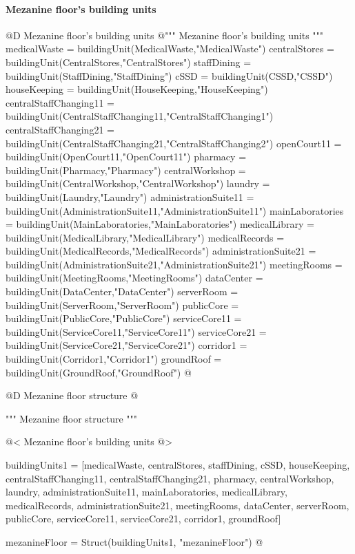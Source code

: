 \documentclass[11pt,oneside]{article}    %
\begin{document}
\paragraph{Mezanine floor's building units}
@D Mezanine floor's building units 
@{""" Mezanine floor's building units """
medicalWaste = buildingUnit(MedicalWaste,"MedicalWaste")
centralStores = buildingUnit(CentralStores,"CentralStores")
staffDining = buildingUnit(StaffDining,"StaffDining")
cSSD = buildingUnit(CSSD,"CSSD")
houseKeeping = buildingUnit(HouseKeeping,"HouseKeeping")
centralStaffChanging11 = buildingUnit(CentralStaffChanging11,"CentralStaffChanging1")
centralStaffChanging21 = buildingUnit(CentralStaffChanging21,"CentralStaffChanging2")
openCourt11 = buildingUnit(OpenCourt11,"OpenCourt11") 
pharmacy = buildingUnit(Pharmacy,"Pharmacy")
centralWorkshop = buildingUnit(CentralWorkshop,"CentralWorkshop")
laundry = buildingUnit(Laundry,"Laundry")
administrationSuite11 = buildingUnit(AdministrationSuite11,"AdministrationSuite11")
mainLaboratories = buildingUnit(MainLaboratories,"MainLaboratories")
medicalLibrary = buildingUnit(MedicalLibrary,"MedicalLibrary")
medicalRecords = buildingUnit(MedicalRecords,"MedicalRecords")
administrationSuite21 = buildingUnit(AdministrationSuite21,"AdministrationSuite21")
meetingRooms = buildingUnit(MeetingRooms,"MeetingRooms")
dataCenter = buildingUnit(DataCenter,"DataCenter")
serverRoom = buildingUnit(ServerRoom,"ServerRoom")
publicCore = buildingUnit(PublicCore,"PublicCore")
serviceCore11 = buildingUnit(ServiceCore11,"ServiceCore11")
serviceCore21 = buildingUnit(ServiceCore21,"ServiceCore21")
corridor1 = buildingUnit(Corridor1,"Corridor1")
groundRoof = buildingUnit(GroundRoof,"GroundRoof")
@}

@D Mezanine floor structure
@{""" Mezanine floor structure """

@< Mezanine floor's building units @>

buildingUnits1 = [medicalWaste, centralStores, staffDining, cSSD, houseKeeping, 
    centralStaffChanging11, centralStaffChanging21, pharmacy, centralWorkshop, laundry, 
    administrationSuite11, mainLaboratories, medicalLibrary, medicalRecords, 
    administrationSuite21, meetingRooms, dataCenter, serverRoom, publicCore, 
    serviceCore11, serviceCore21, corridor1, groundRoof]
    
mezanineFloor = Struct(buildingUnits1, "mezanineFloor")
@}
\end{document}
